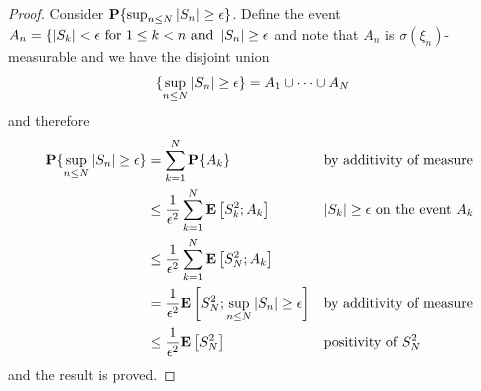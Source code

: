 \begin{proof}
Consider $\textbf{P}\{\sup_{n \leq N} \left \vert S_n \right \vert \geq
  \epsilon\}$.  Define the event $A_n = \lbrace \left \vert S_k \right \vert < \epsilon
\text{ for $1\leq k < n$ and } \left \vert S_n \right \vert \geq
  \epsilon$ and note that $A_n$ is $\sigma(\xi_n)$-measurable and we have the disjoint union 
\begin{align*}
\lbrace \sup_{n \leq N} \left \vert S_n \right \vert \geq
  \epsilon \rbrace &= A_1 \cup \cdots \cup A_N
\end{align*}
and therefore 
\begin{align*}
\textbf{P}\{ \sup_{n \leq N} \left \vert S_n \right \vert \geq
  \epsilon \} &= \sum_{k=1}^N \textbf{P}\{A_k\} & & \text{by additivity
  of measure}\\
&\leq
\frac{1}{\epsilon^2}\sum_{k=1}^N \textbf{E}\left[S_k^2 ; A_k\right] & & \text{$\left \vert S_k \right \vert
\geq \epsilon$ on the event $A_k$}\\
&\leq \frac{1}{\epsilon^2}\sum_{k=1}^N \textbf{E}\left[S_N^2 ; A_k\right] \\
&= \frac{1}{\epsilon^2}\textbf{E}\left[S_N^2 ; { \sup_{n \leq N} \left \vert S_n \right \vert \geq
  \epsilon }\right] & & \text{by additivity
  of measure}\\
&\leq \frac{1}{\epsilon^2}\textbf{E}\left[S_N^2 \right] & & \text{positivity of $S_N^2$}
\end{align*}
and the result is proved.  
\end{proof}

